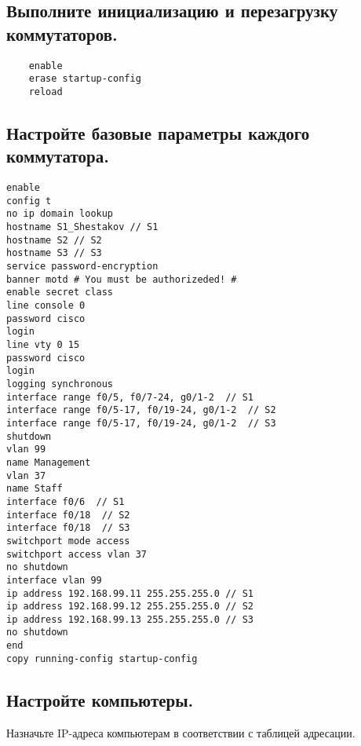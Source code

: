\subsection{Выполните инициализацию и перезагрузку коммутаторов. }
\begin{verbatim}
    enable
    erase startup-config
    reload
\end{verbatim}

\subsection{Настройте базовые параметры каждого коммутатора.}
\begin{verbatim}
enable
config t
no ip domain lookup
hostname S1_Shestakov // S1
hostname S2 // S2
hostname S3 // S3
service password-encryption
banner motd # You must be authorizeded! #
enable secret class
line console 0
password cisco
login
line vty 0 15
password cisco
login
logging synchronous
interface range f0/5, f0/7-24, g0/1-2  // S1
interface range f0/5-17, f0/19-24, g0/1-2  // S2
interface range f0/5-17, f0/19-24, g0/1-2  // S3
shutdown
vlan 99
name Management
vlan 37
name Staff
interface f0/6  // S1
interface f0/18  // S2
interface f0/18  // S3
switchport mode access
switchport access vlan 37
no shutdown
interface vlan 99
ip address 192.168.99.11 255.255.255.0 // S1
ip address 192.168.99.12 255.255.255.0 // S2
ip address 192.168.99.13 255.255.255.0 // S3
no shutdown
end
copy running-config startup-config
\end{verbatim}

\subsection{Настройте компьютеры.}
Назначьте IP-адреса компьютерам в соответствии с таблицей адресации.
